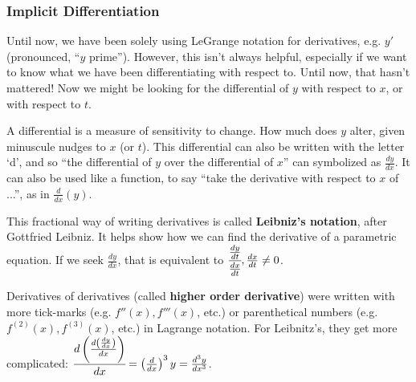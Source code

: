 \subsubsection{Implicit Differentiation}
Until now, we have been solely using LeGrange notation for derivatives, e.g.
$y'$ (pronounced, ``$y$ prime'').  However, this isn't always helpful, especially
if we want to know what we have been differentiating with respect to.  Until now,
that hasn't mattered!  Now we might be looking for the differential of $y$ with 
respect to $x$, or with respect to $t$.

A differential is a measure of sensitivity to change.  How much does $y$ alter,
given minuscule nudges to $x$ (or $t$).  This differential can also be written with the
letter `d', and so ``the differential of $y$ over the differential of $x$'' can symbolized
as $\frac{dy}{dx}$.  It can also be used like a function, to say ``take the derivative with 
respect to $x$ of ...'', as in $\frac{d}{dx}\left( y\right)$.

This fractional way of writing derivatives is called \textbf{Leibniz's notation}, after
Gottfried Leibniz.  It helps show how we can find the derivative of a parametric equation.
If we seek $\frac{dy}{dx}$, that is equivalent to $\cfrac{\frac{dy}{dt}}{\frac{dx}{dt}}, \frac{dx}{dt}\ne
0$.

Derivatives of derivatives (called \textbf{higher order derivative}) were written 
with more tick-marks (e.g. $f''(x), f'''(x)$, etc.) or parenthetical numbers (e.g. $f^{(2)}(x),
f^{(3)}(x)$, etc.) in Lagrange notation.  For Leibnitz's, they get more complicated:
$\cfrac{d\left(\frac{d\left(\frac{dy}{dx}\right)}{dx}\right)}{dx} = 
\left(\frac{d}{dx}\right)^3y = \frac{d^3y}{dx^3}$.
